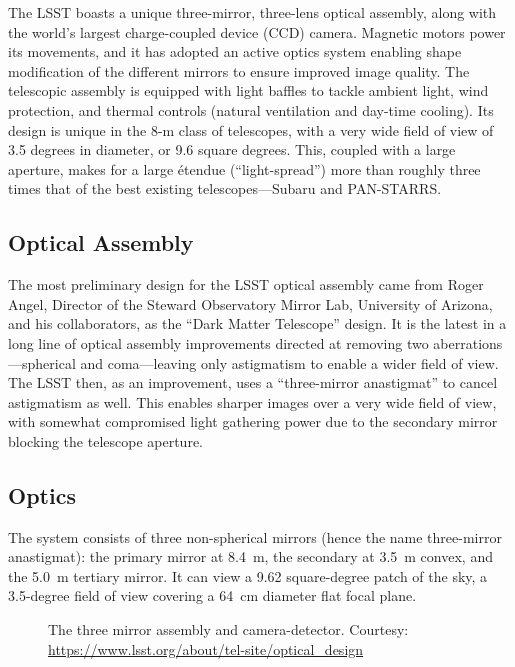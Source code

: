 \documentclass[12pt,a4paper]{article}
\begin{document}
The LSST boasts a unique three-mirror, three-lens optical assembly, along with
the world's largest charge-coupled device (CCD) camera. Magnetic motors power
its movements, and it has adopted an active optics system enabling shape
modification of the different mirrors to ensure improved image quality. The
telescopic assembly is equipped with light baffles to tackle ambient light,
wind protection, and thermal controls (natural ventilation and day-time
cooling). Its design is unique in the 8-m class of telescopes, with a very
wide field of view of 3.5 degrees in diameter, or 9.6 square degrees. This,
coupled with a large aperture, makes for a large \'{e}tendue (``light-spread'')
more than roughly three times that of the best existing telescopes---Subaru
and PAN-STARRS.

\subsection{Optical Assembly}

The most preliminary design for the LSST optical assembly came from Roger
Angel, Director of the Steward Observatory Mirror Lab, University of Arizona,
and his collaborators, as the ``Dark Matter Telescope'' design. It is the
latest in a long line of optical assembly improvements directed at removing
two aberrations---spherical and coma---leaving only astigmatism to enable a
wider field of view. The LSST then, as an improvement, uses a
``three-mirror anastigmat'' to cancel astigmatism as well. This enables
sharper images over a very wide field of view, with somewhat compromised light
gathering power due to the secondary mirror blocking the telescope aperture.

\subsection{Optics}

The system consists of three non-spherical mirrors (hence the name
three-mirror anastigmat): the primary mirror at 8.4~m, the secondary at
3.5~m convex, and the 5.0~m tertiary mirror. It can view a 9.62 square-degree
patch of the sky, a 3.5-degree field of view covering a 64~cm diameter flat
focal plane.

\begin{figure}[htbp]
  \centering
  \caption{The three mirror assembly and camera-detector.
           Courtesy: \url{https://www.lsst.org/about/tel-site/optical_design}}
  \label{fig:threemirror}
\end{figure}
\end{document}
